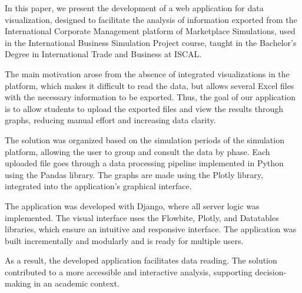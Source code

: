 
In this paper, we present the development of a web application for data visualization, designed to facilitate the analysis of information exported from the International Corporate Management platform of Marketplace Simulations, used in the International Business Simulation Project course, taught in the Bachelor's Degree in International Trade and Business at ISCAL.

The main motivation arose from the absence of integrated visualizations in the platform, which makes it difficult to read the data, but allows several Excel files with the necessary information to be exported. Thus, the goal of our application is to allow students to upload the exported files and view the results through graphs, reducing manual effort and increasing data clarity.

The solution was organized based on the simulation periods of the simulation platform, allowing the user to group and consult the data by phase. Each uploaded file goes through a data processing pipeline implemented in Python using the Pandas library. The graphs are made using the Plotly library, integrated into the application's graphical interface.

The application was developed with Django, where all server logic was implemented. The visual interface uses the Flowbite, Plotly, and Datatables libraries, which ensure an intuitive and responsive interface. The application was built incrementally and modularly and is ready for multiple users.

As a result, the developed application facilitates data reading. The solution contributed to a more accessible and interactive analysis, supporting decision-making in an academic context.